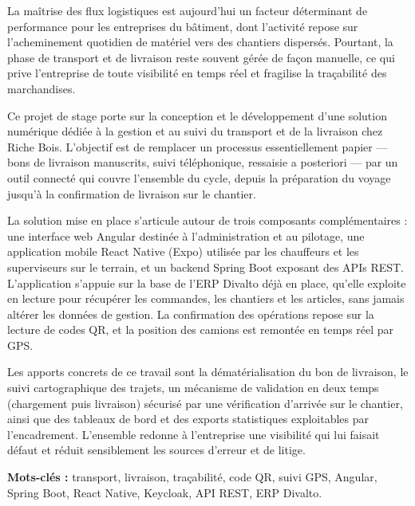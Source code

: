 \documentclass[12pt,a4paper]{report}
\begin{document}
La maîtrise des flux logistiques est aujourd'hui un facteur déterminant de performance pour les entreprises du bâtiment, dont l'activité repose sur l'acheminement quotidien de matériel vers des chantiers dispersés. Pourtant, la phase de transport et de livraison reste souvent gérée de façon manuelle, ce qui prive l'entreprise de toute visibilité en temps réel et fragilise la traçabilité des marchandises.

\vspace{0.5cm}

Ce projet de stage porte sur la conception et le développement d'une solution numérique dédiée à la gestion et au suivi du transport et de la livraison chez Riche Bois. L'objectif est de remplacer un processus essentiellement papier — bons de livraison manuscrits, suivi téléphonique, ressaisie a posteriori — par un outil connecté qui couvre l'ensemble du cycle, depuis la préparation du voyage jusqu'à la confirmation de livraison sur le chantier.

\vspace{0.5cm}

La solution mise en place s'articule autour de trois composants complémentaires : une interface web Angular destinée à l'administration et au pilotage, une application mobile React Native (Expo) utilisée par les chauffeurs et les superviseurs sur le terrain, et un backend Spring Boot exposant des APIs REST. L'application s'appuie sur la base de l'ERP Divalto déjà en place, qu'elle exploite en lecture pour récupérer les commandes, les chantiers et les articles, sans jamais altérer les données de gestion. La confirmation des opérations repose sur la lecture de codes QR, et la position des camions est remontée en temps réel par GPS.

\vspace{0.5cm}

Les apports concrets de ce travail sont la dématérialisation du bon de livraison, le suivi cartographique des trajets, un mécanisme de validation en deux temps (chargement puis livraison) sécurisé par une vérification d'arrivée sur le chantier, ainsi que des tableaux de bord et des exports statistiques exploitables par l'encadrement. L'ensemble redonne à l'entreprise une visibilité qui lui faisait défaut et réduit sensiblement les sources d'erreur et de litige.

\vspace{1cm}

\textbf{Mots-clés :} transport, livraison, traçabilité, code QR, suivi GPS, Angular, Spring Boot, React Native, Keycloak, API REST, ERP Divalto.
\end{document}
